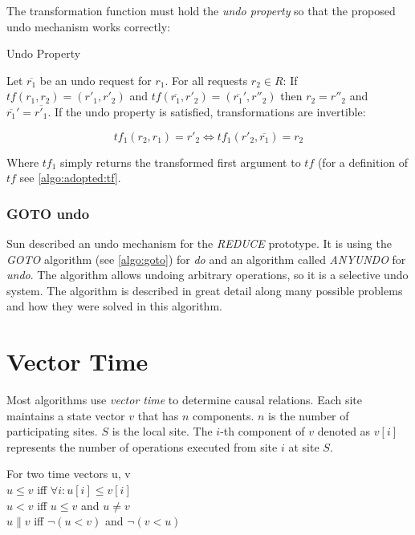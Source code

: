 The transformation function must hold the \emph{undo property} so that the proposed undo mechanism works correctly:

\begin{defn}
Undo Property
\end{defn}

Let $\overline{r_{1}}$ be an undo request for $r_{1}$. For all requests $r_{2} \in R$: If $tf(r_1,r_2) = (r'_1,r'_2)$ and $tf(\overline{r_1},r'_2) = (\overline{r_1}',r''_2)$ then $r_2 = r''_2$ and $\overline{r_1}' = \overline{r'_1}$. If the undo property is satisfied, transformations are invertible:

$$ tf_1(r_2,r_1) = r'_2 \Longleftrightarrow tf_1(r'_2,\overline{r_1}) = r_2 $$

Where $tf_1$ simply returns the transformed first argument to $tf$ (for a definition of $tf$ see \ref{algo:adopted:tf}.


\subsubsection{GOTO undo}
Sun \cite{sun02b} described an undo mechanism for the \emph{REDUCE} prototype. It is using the \emph{GOTO} algorithm (see \ref{algo:goto}) for \emph{do} and an algorithm called \emph{ANYUNDO} for \emph{undo}. The algorithm allows undoing arbitrary operations, so it is a selective undo system. The algorithm is described in great detail along many possible problems and how they were solved in this algorithm.



\section{Vector Time}
\label{sect:vectortime}

Most algorithms use \emph{vector time} to determine causal relations. Each site maintains a state vector $v$ that has $n$ components. $n$ is the number of participating sites. $S$ is the local site. The $i$-th component of $v$ denoted as $v[i]$ represents the number of operations executed from site $i$ at site $S$. 

\begin{defn}
  For two time vectors u, v \\
  $u \leq v$ iff $\forall i : u[i] \leq v[i]$ \\
  $u < v$ iff $u \leq v$ and $u \not= v$ \\
  $u \parallel v$ iff $\neg(u < v)$ and $\neg(v < u)$
\end{defn}

